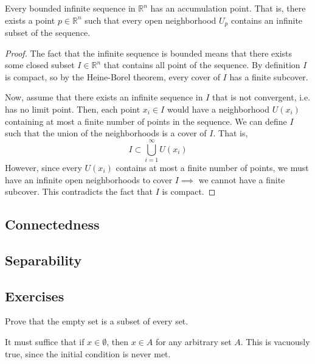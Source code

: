 \documentclass{article}
\begin{document}
    \begin{theorem}
      Every bounded infinite sequence in $\mathbb{R}^n$ has an accumulation point. That is, there exists a point $p \in \mathbb{R}^n$ such that every open neighborhood $U_p$ contains an infinite subset of the sequence. 
    \end{theorem}
    \begin{proof}
      The fact that the infinite sequence is bounded means that there exists some closed subset $I \in \mathbb{R}^n$ that contains all point of the sequence. By definition $I$ is compact, so by the Heine-Borel theorem, every cover of $I$ has a finite subcover. 

      Now, assume that there exists an infinite sequence in $I$ that is not convergent, i.e. has no limit point. Then, each point $x_i \in I$ would have a neighborhood $U(x_i)$ containing at most a finite number of points in the sequence. We can define $I$ such that the union of the neighborhoods is a cover of $I$. That is, 
      \[I \subset \bigcup_{i=1}^\infty U(x_i)\]
      However, since every $U(x_i)$ contains at most a finite number of points, we must have an infinite open neighborhoods to cover $I \implies$ we cannot have a finite subcover. This contradicts the fact that $I$ is compact. 
    \end{proof}

  \subsection{Connectedness}

  \subsection{Separability}

  \subsection{Exercises}

    \begin{exercise}[Rudin 2.1]
    Prove that the empty set is a subset of every set. 
    \end{exercise}
    \begin{solution}
    It must suffice that if $x \in \emptyset$, then $x \in A$ for any arbitrary set $A$. This is vacuously true, since the initial condition is never met. 
    \end{solution}
\end{document}
